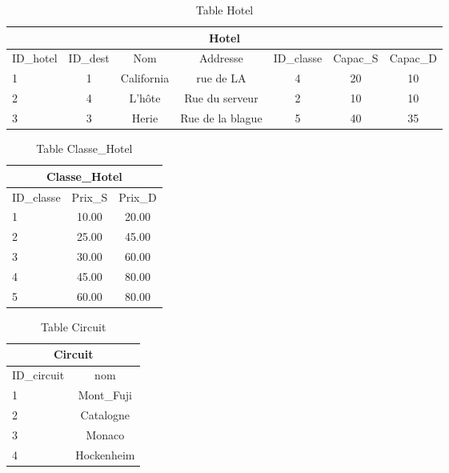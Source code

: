 \documentclass[10pt]{article}
\begin{document}

\begin{table}[h]
\begin{center}
\begin{tabular}{|l|c|c|c|c|c|c|}
\hline
\multicolumn{7}{|c|}{Hotel}\\
\hline
ID\_hotel& ID\_dest& Nom & Addresse &ID\_classe & Capac\_S & Capac\_D  \\
\hline
1 & 1& California&rue de LA& 4 & 20 & 10\\
\hline
2 & 4& L'hôte&Rue du serveur& 2 & 10 & 10\\
\hline
3 & 3& Herie&Rue de la blague& 5 & 40 & 35\\
\hline
\end{tabular}
\end{center}
\caption{Table Hotel}
\end{table}
\newpage


\begin{table}[h]
\begin{center}
\begin{tabular}{|l|c|c|}
\hline
\multicolumn{3}{|c|}{Classe\_Hotel}\\
\hline
ID\_classe& Prix\_S & Prix\_D \\
\hline
1 & 10.00& 20.00\\
\hline
2 & 25.00& 45.00\\
\hline
3 & 30.00& 60.00\\
\hline
4 &  45.00& 80.00\\
\hline
5 & 60.00& 80.00\\
\hline
\end{tabular}
\end{center}
\caption{Table Classe\_Hotel}
\end{table}


\begin{table}[h]
\begin{center}
\begin{tabular}{|l|c|}
\hline
\multicolumn{2}{|c|}{Circuit}\\
\hline
ID\_circuit& nom \\
\hline
1 & Mont\_Fuji\\
\hline
2 & Catalogne\\
\hline
3 & Monaco\\
\hline
4 &  Hockenheim\\
\hline
\end{tabular}
\end{center}
\caption{Table Circuit}
\end{table}
\end{document}
